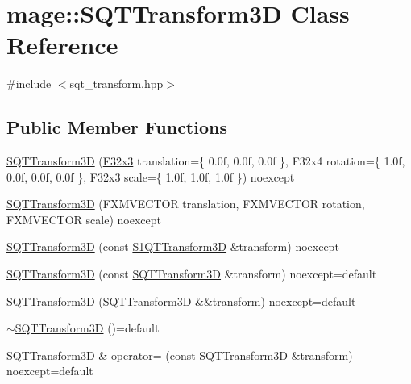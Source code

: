 \hypertarget{classmage_1_1_s_q_t_transform3_d}{}\section{mage\+:\+:S\+Q\+T\+Transform3D Class Reference}
\label{classmage_1_1_s_q_t_transform3_d}


{\ttfamily \#include $<$sqt\+\_\+transform.\+hpp$>$}

\subsection*{Public Member Functions}
\begin{DoxyCompactItemize}
\item 
\mbox{\hyperlink{classmage_1_1_s_q_t_transform3_d_a1dc66952cc899118d0b911526517849e}{S\+Q\+T\+Transform3D}} (\mbox{\hyperlink{namespacemage_a1e3c7a882af461f161caa1cbddaf1fa2}{F32x3}} translation=\{ 0.\+0f, 0.\+0f, 0.\+0f \}, F32x4 rotation=\{ 1.\+0f, 0.\+0f, 0.\+0f, 0.\+0f \}, F32x3 scale=\{ 1.\+0f, 1.\+0f, 1.\+0f \}) noexcept
\item 
\mbox{\hyperlink{classmage_1_1_s_q_t_transform3_d_ad938dc9df7b92c989e3fd958a2f926f9}{S\+Q\+T\+Transform3D}} (F\+X\+M\+V\+E\+C\+T\+OR translation, F\+X\+M\+V\+E\+C\+T\+OR rotation, F\+X\+M\+V\+E\+C\+T\+OR scale) noexcept
\item 
\mbox{\hyperlink{classmage_1_1_s_q_t_transform3_d_a9d11a8ec42af254b5dd0a7920df16bad}{S\+Q\+T\+Transform3D}} (const \mbox{\hyperlink{classmage_1_1_s1_q_t_transform3_d}{S1\+Q\+T\+Transform3D}} \&transform) noexcept
\item 
\mbox{\hyperlink{classmage_1_1_s_q_t_transform3_d_ac108a87d917f68226a2fc1a784c5edb2}{S\+Q\+T\+Transform3D}} (const \mbox{\hyperlink{classmage_1_1_s_q_t_transform3_d}{S\+Q\+T\+Transform3D}} \&transform) noexcept=default
\item 
\mbox{\hyperlink{classmage_1_1_s_q_t_transform3_d_a0bef0194d9b744c1a9a1cb663ff72125}{S\+Q\+T\+Transform3D}} (\mbox{\hyperlink{classmage_1_1_s_q_t_transform3_d}{S\+Q\+T\+Transform3D}} \&\&transform) noexcept=default
\item 
\mbox{\hyperlink{classmage_1_1_s_q_t_transform3_d_a12a230a7be99b854088c2f98bf18526b}{$\sim$\+S\+Q\+T\+Transform3D}} ()=default
\item 
\mbox{\hyperlink{classmage_1_1_s_q_t_transform3_d}{S\+Q\+T\+Transform3D}} \& \mbox{\hyperlink{classmage_1_1_s_q_t_transform3_d_a50a7bb92fcc07b44c77fe9b052e21129}{operator=}} (const \mbox{\hyperlink{classmage_1_1_s_q_t_transform3_d}{S\+Q\+T\+Transform3D}} \&transform) noexcept=default

\end{DoxyCompactItemize}
